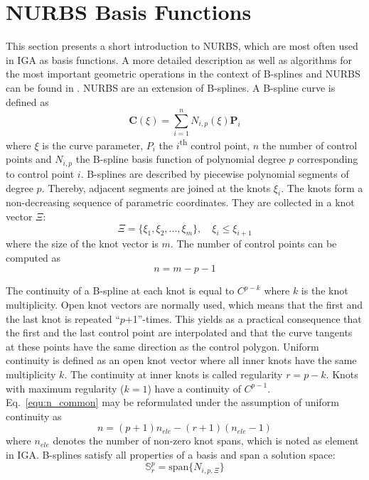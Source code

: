 \documentclass[3p]{elsarticle}
\begin{document}
\section{NURBS Basis Functions} \label{sec:nurbs}
This section presents a short introduction to NURBS, which are most often used in IGA as basis functions. A more detailed description as well as algorithms for the most important geometric operations in the context of B-splines and NURBS can be found in \cite{Piegl1995}. NURBS are an extension of B-splines. A B-spline curve is defined as
\begin{equation}
	\mathbf{C}(\xi) = \sum_{i=1}^{n}N_{i,p}(\xi)\mathbf{P}_i
\end{equation}
where $\xi$ is the curve parameter, $P_i$ the $i$\textsuperscript{th} control point, $n$ the number of control points and $N_{i,p}$ the B-spline basis function of polynomial degree $p$ corresponding to control point $i$. B-splines are described by piecewise polynomial segments of degree $p$. Thereby, adjacent segments are joined at the knots $\xi_i$. The knots form a non-decreasing sequence of parametric coordinates. They are collected in a knot vector $\Xi$:
\begin{equation}
	\Xi = \{\xi_1,\xi_2,...,\xi_m\}, \quad \xi_{i} \leq \xi_{i+1}
\end{equation}
where the size of the knot vector is $m$. The number of control points can be computed as
\begin{equation} \label{equ:n_common}
	n = m - p - 1
\end{equation}

The continuity of a B-spline at each knot is equal to $C^{p-k}$ where $k$ is the knot multiplicity. Open knot vectors are normally used, which means that the first and the last knot is repeated ``$p$+1''-times. This yields as a practical consequence that the first and the last control point are interpolated and that the curve tangents at these points have the same direction as the control polygon. Uniform continuity is defined as an open knot vector where all inner knots have the same multiplicity $k$. The continuity at inner knots is called regularity $r=p-k$. Knots with maximum regularity ($k=1$) have a continuity of $C^{p-1}$. Eq.~\eqref{equ:n_common} may be reformulated under the assumption of uniform continuity as
\begin{equation}\label{equ:n}
	n = (p+1)n_{ele} - (r+1)(n_{ele}-1)
\end{equation}
where $n_{ele}$ denotes the number of non-zero knot spans, which is noted as element in IGA. B-splines satisfy all properties of a basis and span a solution space:
\begin{equation}
	\mathbb{S}^p_r = \text{span}\{{N_{i,p,\Xi}}\}
\end{equation}
\end{document}
